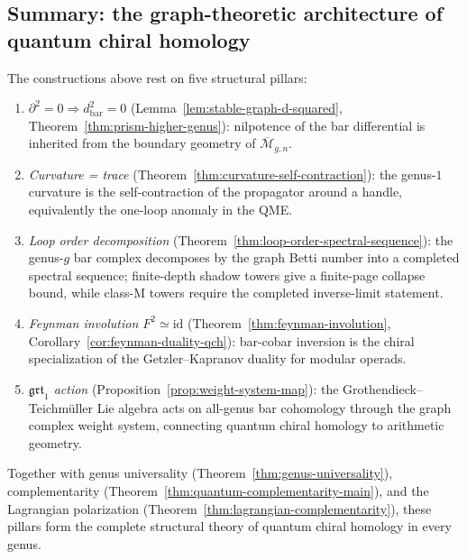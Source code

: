 \subsection{Summary: the graph-theoretic architecture of quantum
chiral homology}
\label{subsec:qch-architecture-summary}

\begin{remark}%
\label{rem:five-pillars}
The constructions above rest on five structural pillars:
\begin{enumerate}[label=\textup{(\Roman*)}]
\item \emph{$\partial^2 = 0 \Rightarrow d_{\mathrm{bar}}^2 = 0$}
 (Lemma~\ref{lem:stable-graph-d-squared},
 Theorem~\ref{thm:prism-higher-genus}):
 nilpotence of the bar differential is inherited from the
 boundary geometry of $\overline{\mathcal{M}}_{g,n}$.
\item \emph{Curvature = trace}
 (Theorem~\ref{thm:curvature-self-contraction}):
 the genus-$1$ curvature is the self-contraction of the
 propagator around a handle, equivalently the one-loop anomaly
 in the QME.
\item \emph{Loop order decomposition}
 (Theorem~\ref{thm:loop-order-spectral-sequence}):
 the genus-$g$ bar complex decomposes by the graph Betti number
 into a completed spectral sequence; finite-depth shadow towers give
 a finite-page collapse bound, while class-M towers require the
 completed inverse-limit statement.
\item \emph{Feynman involution $F^2 \simeq \mathrm{id}$}
 (Theorem~\ref{thm:feynman-involution},
 Corollary~\ref{cor:feynman-duality-qch}):
 bar-cobar inversion is the chiral specialization of the
 Getzler--Kapranov duality for modular operads.
\item \emph{$\mathfrak{grt}_1$ action}
 (Proposition~\ref{prop:weight-system-map}):
 the Grothendieck--Teichm\"uller Lie algebra acts on
 all-genus bar cohomology through the graph complex weight
 system, connecting quantum chiral homology to arithmetic
 geometry.
\end{enumerate}
Together with genus universality
(Theorem~\ref{thm:genus-universality}), complementarity
(Theorem~\ref{thm:quantum-complementarity-main}), and the
Lagrangian polarization
(Theorem~\ref{thm:lagrangian-complementarity}),
these pillars form the complete structural theory of quantum chiral
homology in every genus.
\end{remark}

